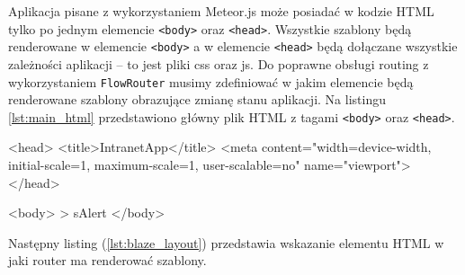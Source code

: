 Aplikacja pisane z wykorzystaniem Meteor.js może posiadać w kodzie HTML tylko po jednym elemencie \verb|<body>| oraz \verb|<head>|. Wszystkie szablony będą renderowane w elemencie \verb|<body>| a w elemencie \verb|<head>| będą dołączane wszystkie zależności aplikacji -- to jest pliki css oraz js. Do poprawne obsługi routing z wykorzystaniem \verb|FlowRouter| musimy zdefiniować w jakim elemencie będą renderowane szablony obrazujące zmianę stanu aplikacji. Na listingu \ref{lst:main_html} przedstawiono główny plik HTML z tagami \verb|<body>| oraz \verb|<head>|. 
\begin{html}[caption={Główny plik HTML},label={lst:main_html}]
<head>
    <title>IntranetApp</title>
    <meta content="width=device-width, initial-scale=1, maximum-scale=1, user-scalable=no" name="viewport">
</head>

<body>
{{> sAlert}}
</body>
\end{html}
Następny listing (\ref{lst:blaze_layout}) przedstawia wskazanie elementu HTML w jaki router ma renderować szablony. 

